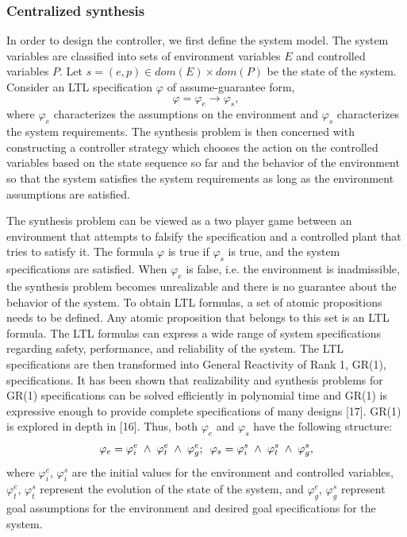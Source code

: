 \documentclass[journal]{IEEEtran}
\newcommand{\aand}{\hspace{1mm}\wedge\hspace{1mm}}
\begin{document}
\subsubsection{Centralized synthesis}
In order to design the controller, we first define the system model. The system variables are classified into sets of environment variables $E$ and controlled variables $P$. Let $s = (e,p) \in dom(E) \times dom(P)$ be the state of the system. Consider an LTL specification $\varphi$ of assume-guarantee form,
\begin{equation}\varphi= \varphi_{e} \rightarrow \varphi_{s},\end{equation} where $\varphi_{e}$ characterizes the assumptions on the environment and $\varphi_{s}$ characterizes the system requirements. The synthesis problem
is then concerned with constructing a controller strategy which chooses
the action on the controlled variables based on the state
sequence so far and the behavior of the environment so
that the system satisfies the system requirements as
long as the environment assumptions are satisfied.

The synthesis problem can be viewed as a two player
game between an environment that attempts to falsify the
specification and a controlled plant that tries to satisfy it. The formula $\varphi$ is true if $\varphi_{s}$ is true, and the system specifications are satisfied. When $\varphi_{e}$ is false, i.e. the environment is inadmissible, the synthesis problem becomes unrealizable and there is no guarantee about the behavior of the system. To obtain LTL formulas, a set of atomic propositions needs to be defined. Any atomic proposition that belongs to this set is an LTL formula. The LTL formulas can express a wide range of system specifications regarding safety, performance, and reliability of the system.
The LTL specifications are then transformed into General Reactivity of Rank 1, GR(1), specifications. It has been shown that realizability and synthesis problems for GR(1) specifications can be solved efficiently in polynomial time and GR(1) is expressive enough to provide complete specifications of many designs [17]. GR(1) is explored in depth in [16]. Thus, both $\varphi_{e}$ and $\varphi_{s}$ have the following structure: 
\begin{equation}
\varphi_{e} = \varphi^{e}_{i} \aand \varphi^{e}_{t} \aand \varphi^{e}_{g}; \enspace
\varphi_{s} = \varphi^{s}_{i} \aand \varphi^{s}_{t} \aand \varphi^{s}_{g},
\end{equation}
where $\varphi^{e}_{i}$, $\varphi^{s}_{i}$ are the initial values for the environment and controlled variables, $\varphi^{e}_{t}$, $\varphi^{s}_{t}$ represent the evolution of the state of the system, and $\varphi^{e}_{g}$, $\varphi^{s}_{g}$ represent goal assumptions for the environment and desired goal specifications for the system. 
\end{document}
